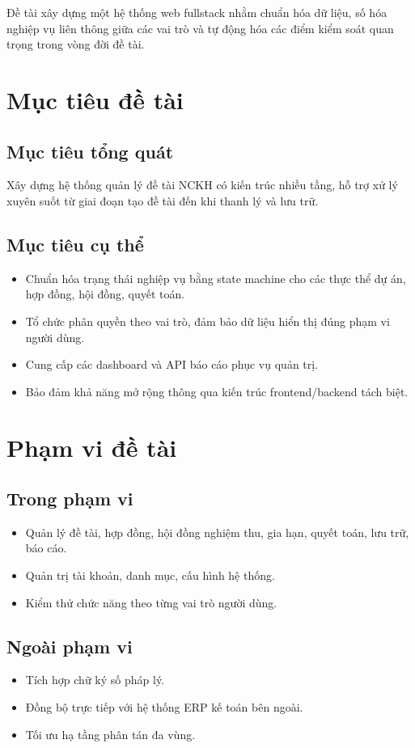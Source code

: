 \documentclass[12pt,a4paper]{report}
\begin{document}
Đề tài xây dựng một hệ thống web fullstack nhằm chuẩn hóa dữ liệu, số hóa nghiệp vụ liên thông giữa các vai trò và tự động hóa các điểm kiểm soát quan trọng trong vòng đời đề tài.

\section{Mục tiêu đề tài}
\subsection{Mục tiêu tổng quát}
Xây dựng hệ thống quản lý đề tài NCKH có kiến trúc nhiều tầng, hỗ trợ xử lý xuyên suốt từ giai đoạn tạo đề tài đến khi thanh lý và lưu trữ.

\subsection{Mục tiêu cụ thể}
\begin{itemize}[leftmargin=1.2cm]
\item Chuẩn hóa trạng thái nghiệp vụ bằng state machine cho các thực thể dự án, hợp đồng, hội đồng, quyết toán.
\item Tổ chức phân quyền theo vai trò, đảm bảo dữ liệu hiển thị đúng phạm vi người dùng.
\item Cung cấp các dashboard và API báo cáo phục vụ quản trị.
\item Bảo đảm khả năng mở rộng thông qua kiến trúc frontend/backend tách biệt.
\end{itemize}

\section{Phạm vi đề tài}
\subsection{Trong phạm vi}
\begin{itemize}[leftmargin=1.2cm]
\item Quản lý đề tài, hợp đồng, hội đồng nghiệm thu, gia hạn, quyết toán, lưu trữ, báo cáo.
\item Quản trị tài khoản, danh mục, cấu hình hệ thống.
\item Kiểm thử chức năng theo từng vai trò người dùng.
\end{itemize}

\subsection{Ngoài phạm vi}
\begin{itemize}[leftmargin=1.2cm]
\item Tích hợp chữ ký số pháp lý.
\item Đồng bộ trực tiếp với hệ thống ERP kế toán bên ngoài.
\item Tối ưu hạ tầng phân tán đa vùng.
\end{itemize}
\end{document}
